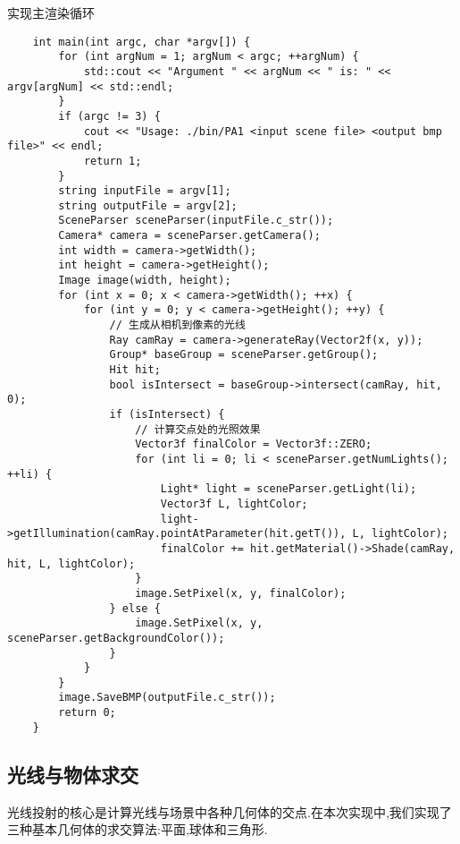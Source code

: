 \documentclass[a4paper,twoside]{article}
\begin{document}
\begin{listing}[H]
    \caption{实现主渲染循环}
    \label{code:main_loop}
    \begin{verbatim}
    int main(int argc, char *argv[]) {
        for (int argNum = 1; argNum < argc; ++argNum) {
            std::cout << "Argument " << argNum << " is: " << argv[argNum] << std::endl;
        }
        if (argc != 3) {
            cout << "Usage: ./bin/PA1 <input scene file> <output bmp file>" << endl;
            return 1;
        }
        string inputFile = argv[1];
        string outputFile = argv[2];  
        SceneParser sceneParser(inputFile.c_str());
        Camera* camera = sceneParser.getCamera();
        int width = camera->getWidth();
        int height = camera->getHeight();
        Image image(width, height);
        for (int x = 0; x < camera->getWidth(); ++x) {
            for (int y = 0; y < camera->getHeight(); ++y) {
                // 生成从相机到像素的光线
                Ray camRay = camera->generateRay(Vector2f(x, y));
                Group* baseGroup = sceneParser.getGroup();
                Hit hit;
                bool isIntersect = baseGroup->intersect(camRay, hit, 0);   
                if (isIntersect) {
                    // 计算交点处的光照效果
                    Vector3f finalColor = Vector3f::ZERO;
                    for (int li = 0; li < sceneParser.getNumLights(); ++li) {
                        Light* light = sceneParser.getLight(li);
                        Vector3f L, lightColor;
                        light->getIllumination(camRay.pointAtParameter(hit.getT()), L, lightColor);
                        finalColor += hit.getMaterial()->Shade(camRay, hit, L, lightColor);
                    }
                    image.SetPixel(x, y, finalColor);
                } else {
                    image.SetPixel(x, y, sceneParser.getBackgroundColor());
                }
            }
        }
        image.SaveBMP(outputFile.c_str());
        return 0;
    }
    \end{verbatim}
\end{listing}

\subsection{光线与物体求交}
光线投射的核心是计算光线与场景中各种几何体的交点.在本次实现中,我们实现了三种基本几何体的求交算法:平面,球体和三角形.
\end{document}
